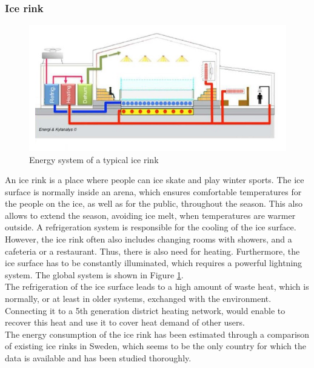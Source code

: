 \documentclass{article}
\begin{document}
\subsubsection{Ice rink}

\begin{figure}[h!]
\centering
\includegraphics[width=1\textwidth]{IR_schema.JPG}
\caption{Energy system of a typical ice rink \cite{gronqvistComparativeLifecycleCost}}
\label{fig:IR_schema}
\end{figure}

An ice rink is a place where people can ice skate and play winter sports. The ice surface is normally inside an arena, which ensures comfortable temperatures for the people on the ice, as well as for the public, throughout the season. This also allows to extend the season, avoiding ice melt, when temperatures are warmer outside. A refrigeration system is responsible for the cooling of the ice surface. However, the ice rink often also includes changing rooms with showers, and a cafeteria or a restaurant. Thus, there is also need for heating. Furthermore, the ice surface has to be constantly illuminated, which requires a powerful lightning system. The global system is shown in Figure \ref{fig:IR_schema}.\\

The refrigeration of the ice surface leads to a high amount of waste heat, which is normally, or at least in older systems, exchanged with the environment. Connecting it to a 5th generation district heating network, would enable to recover this heat and use it to cover heat demand of other users.\\

The energy consumption of the ice rink has been estimated through a comparison of existing ice rinks in Sweden, which seems to be the only country for which the data is available and has been studied thoroughly.
\end{document}
